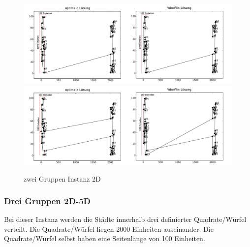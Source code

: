 \documentclass[11pt,a4paper]{article}
\begin{document}
\begin{figure}[H]
    \centering
    \includegraphics[width=16cm]{gfx/crowds2_hpp_comparison}
    \includegraphics[width=16cm]{gfx/crowds2_tsp_comparison}
    \caption{zwei Gruppen Instanz 2D}
    \label{img:crowds2_comparison}
\end{figure}

\subsubsection{Drei Gruppen 2D-5D}
Bei dieser Instanz werden die Städte innerhalb drei definierter Quadrate/Würfel verteilt. Die Quadrate/Würfel liegen 2000 Einheiten auseinander. Die Quadrate/Würfel selbst haben eine Seitenlänge von 100 Einheiten.
\end{document}
